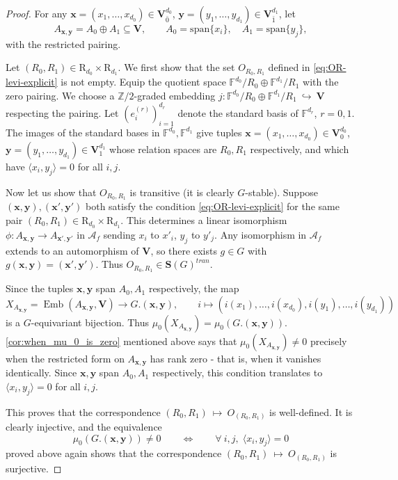 \documentclass[11pt,a4paper]{amsart}
\theoremstyle{plain}%
\theoremstyle{definition}
\theoremstyle{remark}
\newcommand{\Span}{\mathrm{span}}
\newcommand{\Z}{{\mathbb Z}}
\newcommand{\V}{\mathbf{V}}
\newcommand{\F}{{\mathbb F}}
\newcommand{\Emb}{\operatorname{Emb}}
\newcommand{\Set}[1]{\mathbf{S}(#1)}
\begin{document}
\begin{proof}
For any $\mathbf x=(x_1,\ldots,x_{d_0})\in\V_{\bar 0}^{d_0}$, $\mathbf y=(y_1,\ldots,y_{d_1})\in\V_{\bar 1}^{d_1}$, let $$A_{\mathbf x,\mathbf y}=A_{0}\oplus A_{1}\subseteq \V,
 \qquad
 A_{ 0}=\Span\{x_i\},\quad A_{ 1}=\Span\{y_j\},$$ with the restricted pairing.

Let $(R_0, R_1)\in \mathrm{R}_{d_0}\times \mathrm{R}_{d_1}$. We first show that the set ${O_{R_0, R_1}}$ defined in {\eqref{eq:OR-levi-explicit}} is not empty. Equip the quotient space $\F^{d_0}/R_0\oplus \F^{d_1}/R_1$ with the zero pairing. We choose a $\Z/2$-graded embedding $ j:\F^{d_0}/R_0\oplus \F^{d_1}/R_1~\hookrightarrow~\mathbf V$ respecting the pairing. 
 Let $(e^{(r)}_i)_{i=1}^{{d_r}}$ denote the standard basis of $\F^{d_r}$, $r=0,1$. The images of the standard bases in $\F^{d_0}, \F^{d_1}$ give tuples $\mathbf x=(x_1,\ldots,x_{d_0})\in\mathbf V_0^{d_0}$, $\mathbf y=(y_1,\ldots,y_{d_1})\in\mathbf V_1^{d_1}$ whose relation spaces are $R_0, R_1$ respectively, and which have $\langle x_i,y_j\rangle=0$ for all $i,j$.

Now let us show that ${O_{R_0, R_1}}$ is transitive (it is clearly $G$-stable). Suppose $(\mathbf x,\mathbf y),(\mathbf x',\mathbf y')$ both satisfy the condition \eqref{eq:OR-levi-explicit} for the same pair $(R_0, R_1)\in \mathrm{R}_{d_0}\times \mathrm{R}_{d_1}$. This determines a linear isomorphism $\phi:A_{\mathbf x,\mathbf y}\to A_{\mathbf x',\mathbf y'}$ in $\mathcal{A}_f$ sending $x_i$ to $x'_i$, ${y_j}$ to ${y'_j}$. Any isomorphism in $\mathcal{A}_f$ extends to an automorphism of $\mathbf{V}$, so there exists $g\in G$ with $g(\mathbf x,\mathbf y)=(\mathbf x',\mathbf y')$. Thus ${O_{R_0, R_1}} \in \Set{G}^{tran}$. 


Since the tuples $ \mathbf x,\mathbf y$ span $A_0, A_1$ respectively, the map
\[
 X_{A_{\mathbf x,\mathbf y}}=\Emb(A_{\mathbf x,\mathbf y},\mathbf V)
 \longrightarrow G.(\mathbf x,\mathbf y),
 \qquad
 i\longmapsto{(i(x_1),\ldots,i(x_{d_0}),i(y_1),\ldots,i(y_{d_1}))}
\]
is a $G$-equivariant bijection. Thus $\mu_0( X_{A_{\mathbf x,\mathbf y}})=\mu_0(G.(\mathbf x,\mathbf y))$. \cref{cor:when_mu_0_is_zero} mentioned above says that $\mu_0( X_{A_{\mathbf x,\mathbf y}}){\neq} 0$ precisely when the restricted form on $A_{\mathbf x,\mathbf y}$ has rank zero - that is, when it vanishes identically. Since $ \mathbf x,\mathbf y$ span $A_0, A_1$ respectively, this condition translates to $\langle x_i,y_j\rangle=0$ for all $i,j$.

This proves that the correspondence $(R_0, R_1)~\mapsto~ O_{(R_0, R_1)}$ is well-defined. It is clearly injective, and the equivalence 
$$\mu_0({G.(\mathbf x,\mathbf y)})\neq 0 \qquad \Longleftrightarrow \qquad \forall ~i, j, \;\langle {x_i,y_j}\rangle=0 $$
proved above again shows that the correspondence $(R_0, R_1)~\mapsto~ O_{(R_0, R_1)}$ is surjective.



\end{proof}
\end{document}

